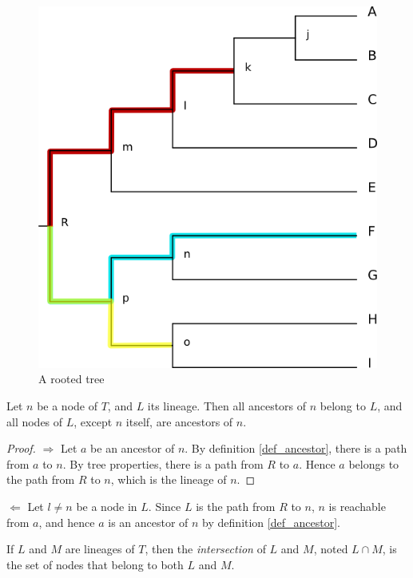 {\begin{figure}[b]
 \centering
 \includegraphics{prop_tree.png}
  \caption{A rooted tree}
 \label{fig_app_tree_prop}
\end{figure}

\begin{prop}
\label{prop_lineage_ancestors_equivalence}
Let $n$ be a node of $T$, and $L$ its lineage. Then all ancestors of $n$ belong to $L$, and all nodes of $L$, except $n$ itself, are ancestors of $n$.
\end{prop}

\begin{proof}

$\Rightarrow$ Let $a$ be an ancestor of $n$. By definition \ref{def_ancestor}, there is a path from $a$ to $n$. By tree properties, there is a path from $R$ to $a$. Hence $a$ belongs to the path from $R$ to $n$, which is the lineage of $n$.
\end{proof}

\noindent{}$\Leftarrow$ Let $l \neq n$ be a node in $L$. Since $L$ is the path from $R$ to $n$, $n$ is reachable from $a$, and hence $a$ is an ancestor of $n$ by definition \ref{def_ancestor}.

\begin{dfn}
If $L$ and $M$ are lineages of $T$, then the \textit{intersection}
of $L$ and $M$, noted $L \cap M$, is the set of nodes that belong to both $L$ and $M$.
\end{dfn} 

}
